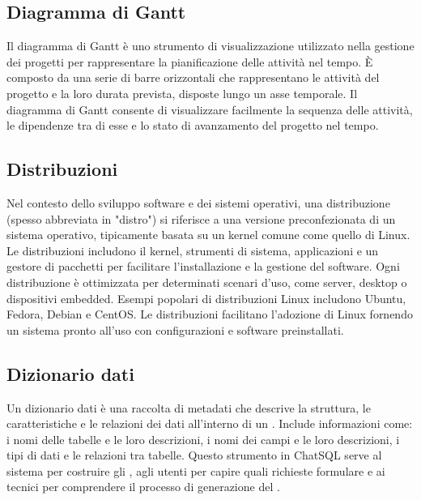 \vspace{2em}
\subsection*{Diagramma di Gantt}
\par Il diagramma di Gantt è uno strumento di visualizzazione utilizzato nella gestione dei progetti per rappresentare la pianificazione delle attività nel tempo. È composto da una serie di barre orizzontali che rappresentano le attività del progetto e la loro durata prevista, disposte lungo un asse temporale. Il diagramma di Gantt consente di visualizzare facilmente la sequenza delle attività, le dipendenze tra di esse e lo stato di avanzamento del progetto nel tempo.

\vspace{2em}
\subsection*{Distribuzioni}
\par Nel contesto dello sviluppo software e dei sistemi operativi, una distribuzione (spesso abbreviata in "distro") si riferisce a una versione preconfezionata di un sistema operativo, tipicamente basata su un kernel comune come quello di Linux. Le distribuzioni includono il kernel, strumenti di sistema, applicazioni e un gestore di pacchetti per facilitare l'installazione e la gestione del software. Ogni distribuzione è ottimizzata per determinati scenari d'uso, come server, desktop o dispositivi embedded. Esempi popolari di distribuzioni Linux includono Ubuntu, Fedora, Debian e CentOS. Le distribuzioni facilitano l'adozione di Linux fornendo un sistema pronto all'uso con configurazioni e software preinstallati.

\vspace{2em}
\subsection*{Dizionario dati}
\par Un dizionario dati è una raccolta di metadati che descrive la struttura, le caratteristiche e le relazioni dei dati all'interno di un . Include informazioni come: i nomi delle tabelle e le loro descrizioni, i nomi dei campi e le loro descrizioni, i tipi di dati e le relazioni tra tabelle. Questo strumento in ChatSQL serve al sistema per costruire gli , agli utenti per capire quali richieste formulare e ai tecnici per comprendere il processo di generazione del .

